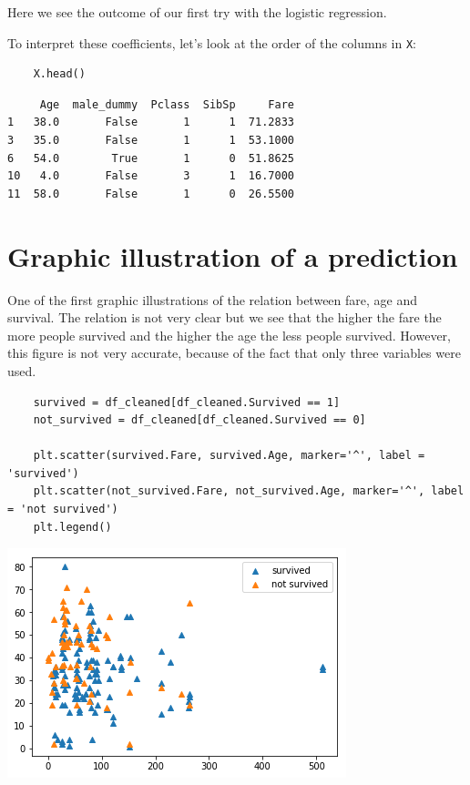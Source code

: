 \documentclass[11pt]{article}
\begin{document}
Here we see the outcome of our first try with the logistic regression.

To interpret these coefficients, let's look at the order of the columns
in \texttt{X}:

\begin{verbatim}
    X.head()
\end{verbatim}

\begin{verbatim}
     Age  male_dummy  Pclass  SibSp     Fare
1   38.0       False       1      1  71.2833
3   35.0       False       1      1  53.1000
6   54.0        True       1      0  51.8625
10   4.0       False       3      1  16.7000
11  58.0       False       1      0  26.5500
\end{verbatim}

\section{Graphic illustration of a prediction}
\label{graphic-illustration-of-a-prediction}
One of the first graphic illustrations of the relation between fare, age
and survival. The relation is not very clear but we see that the higher
the fare the more people survived and the higher the age the less people
survived. However, this figure is not very accurate, because of the fact
that only three variables were used.

\begin{verbatim}
    survived = df_cleaned[df_cleaned.Survived == 1]
    not_survived = df_cleaned[df_cleaned.Survived == 0]

    plt.scatter(survived.Fare, survived.Age, marker='^', label = 'survived')
    plt.scatter(not_survived.Fare, not_survived.Age, marker='^', label = 'not survived')
    plt.legend()
\end{verbatim}

\begin{center}
\includegraphics[width=.9\linewidth]{obipy-resources/37cee3acc6d688dc7952727caad1e09e-1377aDo.png}
\end{center}
\end{document}
